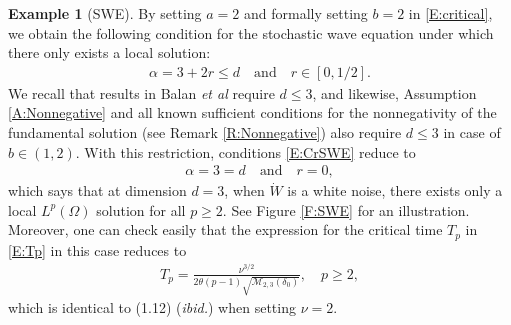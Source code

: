 \documentclass[a4paper,11pt]{article}
\numberwithin{equation}{section}
\numberwithin{equation}{section}
\theoremstyle{plain}
\theoremstyle{definition}
\newtheorem{example}[theorem]{Example}
\newcommand{\W}{\dot{W}}
\begin{document}
\begin{example}[SWE] \label{Eg:CriSWE}
  By setting $a=2$ and formally setting $b=2$ in \eqref{E:critical}, we obtain the following
  condition for the stochastic wave equation under which there only exists a local solution:
  \begin{align} \label{E:CrSWE}
    \alpha=3 + 2 r\le d \quad \text{and} \quad r\in[0,1/2].
  \end{align}
  We recall that results in Balan {\it et al} \cite{BCC21} require $d\le 3$, and likewise,
  Assumption \ref{A:Nonnegative} and all known sufficient conditions for the nonnegativity of the
  fundamental solution (see Remark \ref{R:Nonnegative}) also require $d\le 3$ in case of $b\in
  (1,2)$. With this restriction, conditions \eqref{E:CrSWE} reduce to
  \begin{align*}
    \alpha=3=d \quad \text{and} \quad r=0,
  \end{align*}
  which says that at dimension $d=3$, when $\W$ is a white noise, there exists only a local
  $L^p(\Omega)$ solution for all $p\ge 2$. See Figure \ref{F:SWE} for an illustration. Moreover, one
  can check easily that the expression for the critical time $T_p$ in \eqref{E:Tp} in this case
  reduces to
  \begin{align} \label{E:TpCrSWE}
    T_p=  \frac{\nu^{3 / 2}}{2\theta (p-1) \sqrt{\mathcal{M}_{2,3}(\delta_0)}},  \quad p\ge 2,
  \end{align}
  which is identical to (1.12) ({\it ibid.}) when setting $\nu=2$. \bigskip
\end{example}
\end{document}
